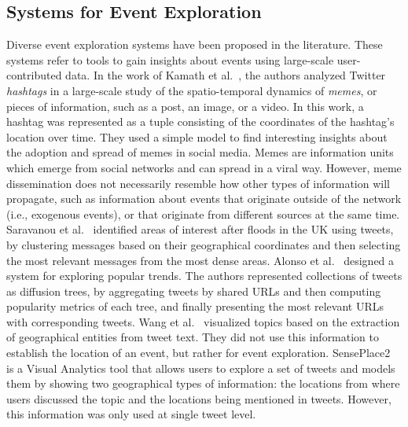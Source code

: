 \subsection{Systems for Event Exploration}
%
Diverse event exploration systems have been proposed in the literature.
%
These systems refer to tools to gain insights about events using large-scale user-contributed data.
%
In the work of Kamath et al.~\cite{Kamath:2013:SDO:2488388.2488447}, the authors
analyzed Twitter \emph{hashtags} in a large-scale study of the spatio-temporal
dynamics of {\em memes}, or pieces of information, such as a post, an image, or
a video. 
%
In this work, a hashtag was represented as a tuple consisting of the coordinates
of the hashtag's location over time. 
%
They used a simple model to find interesting insights about the adoption and
spread of memes in social media. 
%
Memes are information units which emerge from social networks and can spread in
a viral way. 
%
However, meme dissemination does not necessarily resemble how other types of
information will propagate, such as information about events that originate
outside of the network (i.e., exogenous events), or that originate from
different sources at the same time.
%
Saravanou et al.~\cite{Saravanou:Twitter:2015} identified areas of interest
after floods in the UK using tweets, by clustering messages based on their
geographical coordinates and then selecting the most relevant messages from the
most dense areas.
%
Alonso et al.~\cite{Alonso:2017:WHH:3091478.3091484} designed a system for
exploring popular trends. 
%
The authors represented collections of tweets as diffusion trees, by
aggregating tweets by shared URLs and then computing popularity metrics of each
tree, and finally presenting the most relevant URLs with corresponding tweets.
%
Wang et al.~\cite{Wang:LeadLine:2012} visualized topics based on the extraction
of geographical entities from tweet text. 
%
They did not use this information to establish the location of an event, but
rather for event exploration.
%
SensePlace2~\cite{MacEachren:SensePlace2:2011} is a Visual Analytics tool that
allows users to explore a set of tweets and models them by showing two
geographical types of information: the locations from where users discussed the
topic and the locations being mentioned in tweets. 
%
However, this information was only used at single tweet level.


